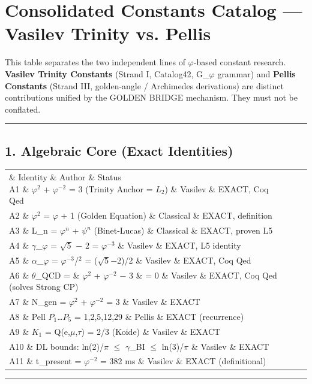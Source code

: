 
\section{Consolidated Constants Catalog --- Vasilev Trinity vs. Pellis}

This table separates the two independent lines of $\varphi$-based constant research. \textbf{Vasilev Trinity Constants} (Strand I, Catalog42, G\_$\varphi$ grammar) and \textbf{Pellis Constants} (Strand III, golden-angle / Archimedes derivations) are distinct contributions unified by the GOLDEN BRIDGE mechanism. They must not be conflated.

\noindent\rule{\textwidth}{0.4pt}

\subsection{1. Algebraic Core (Exact Identities)}

\begin{tabular}{|l|l|l|l|}
\hline
\section{\& Identity \& Author \& Status \\}
\hline
A1 \& $\varphi^{2}$ + $\varphi^{-2}$ = 3 (Trinity Anchor = $L_{2}$) \& Vasilev \& EXACT, Coq Qed \\
A2 \& $\varphi^{2}$ = $\varphi$ + 1 (Golden Equation) \& Classical \& EXACT, definition \\
A3 \& L\_n = $\varphi^{n}$ + $\psi^{n}$ (Binet-Lucas) \& Classical \& EXACT, proven L5 \\
A4 \& $\gamma$\_$\varphi$ = $\sqrt{5}$ $-$ 2 = $\varphi^{-3}$ \& Vasilev \& EXACT, L5 identity \\
A5 \& $\alpha$\_$\varphi$ = $\varphi^{-3}$/$^{2}$ = ($\sqrt{5}$$-$2)/2 \& Vasilev \& EXACT, Coq Qed \\
A6 \& $\theta$\_QCD = \& $\varphi^{2}$ + $\varphi^{-2}$ $-$ 3 \& = 0 \& Vasilev \& EXACT, Coq Qed (solves Strong CP) \\
A7 \& N\_gen = $\varphi^{2}$ + $\varphi^{-2}$ = 3 \& Vasilev \& EXACT \\
A8 \& Pell $P_{1}$…$P_{5}$ = 1,2,5,12,29 \& Pellis \& EXACT (recurrence) \\
A9 \& $K_{1}$ = Q(e,$\mu$,$\tau$) = 2/3 (Koide) \& Vasilev \& EXACT \\
A10 \& DL bounds: ln(2)/$\pi$ $\leq$ $\gamma$\_BI $\leq$ ln(3)/$\pi$ \& Vasilev \& EXACT \\
A11 \& t\_present = $\varphi^{-2}$ = 382 ms \& Vasilev \& EXACT (definitional) \\
\hline
\end{tabular}
\noindent\rule{\textwidth}{0.4pt}


